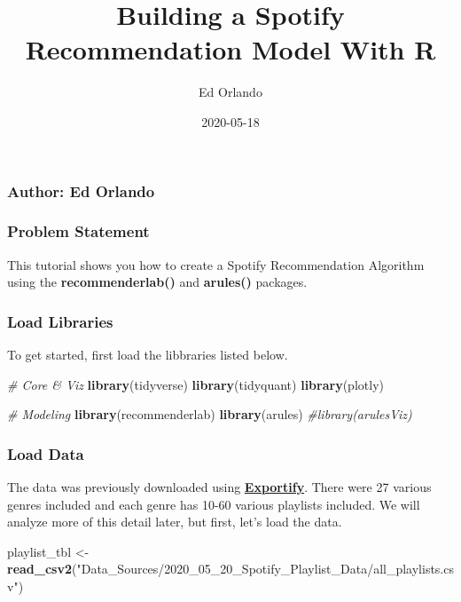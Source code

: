 \documentclass[
]{article}
\title{Building a Spotify Recommendation Model With R}
\author{Ed Orlando}
\date{2020-05-18}
\newenvironment{Shaded}{\begin{snugshade}}{\end{snugshade}}
\newcommand{\CommentTok}[1]{\textcolor[rgb]{0.56,0.35,0.01}{\textit{#1}}}
\newcommand{\KeywordTok}[1]{\textcolor[rgb]{0.13,0.29,0.53}{\textbf{#1}}}
\newcommand{\NormalTok}[1]{#1}
\newcommand{\StringTok}[1]{\textcolor[rgb]{0.31,0.60,0.02}{#1}}
\begin{document}
\maketitle

\hypertarget{author-ed-orlando}{%
\subsubsection{Author: Ed Orlando}\label{author-ed-orlando}}

\hypertarget{problem-statement}{%
\subsubsection{Problem Statement}\label{problem-statement}}

This tutorial shows you how to create a Spotify Recommendation Algorithm
using the \textbf{recommenderlab()} and \textbf{arules()} packages.

\hypertarget{load-libraries}{%
\subsubsection{Load Libraries}\label{load-libraries}}

To get started, first load the libbraries listed below.

\begin{Shaded}
\begin{Highlighting}[]
\CommentTok{# Core & Viz}
\KeywordTok{library}\NormalTok{(tidyverse)}
\KeywordTok{library}\NormalTok{(tidyquant)}
\KeywordTok{library}\NormalTok{(plotly)}

\CommentTok{# Modeling}
\KeywordTok{library}\NormalTok{(recommenderlab)}
\KeywordTok{library}\NormalTok{(arules)}
\CommentTok{#library(arulesViz)}
\end{Highlighting}
\end{Shaded}

\hypertarget{load-data}{%
\subsubsection{Load Data}\label{load-data}}

The data was previously downloaded using
\textbf{\href{https://rawgit.com/watsonbox/exportify/master/exportify.html}{Exportify}}.
There were 27 various genres included and each genre has 10-60 various
playlists included. We will analyze more of this detail later, but
first, let's load the data.

\begin{Shaded}
\begin{Highlighting}[]
\NormalTok{playlist_tbl <-}\StringTok{ }\KeywordTok{read_csv2}\NormalTok{(}\StringTok{"Data_Sources/2020_05_20_Spotify_Playlist_Data/all_playlists.csv"}\NormalTok{)}
\end{Highlighting}
\end{Shaded}
\end{document}
